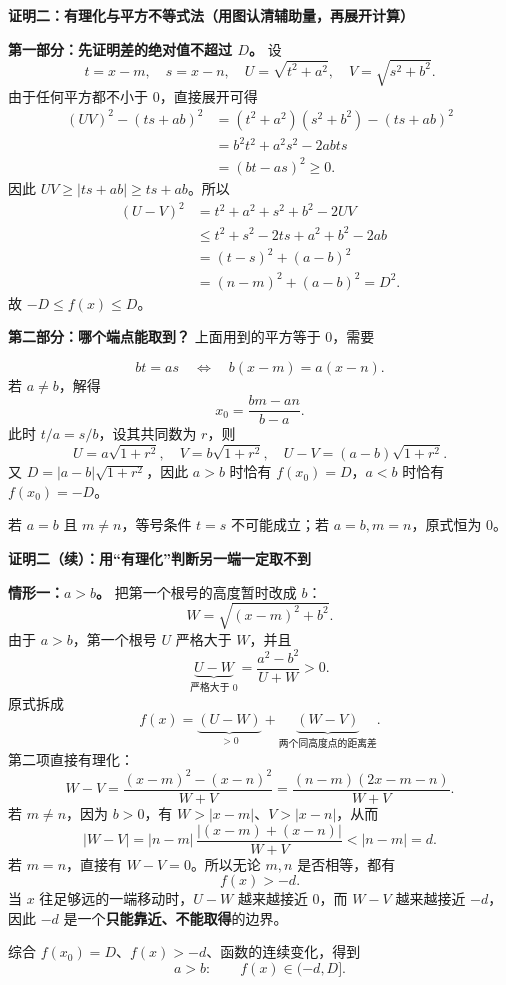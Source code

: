 \begin{proofbox}
\textbf{\textcolor{CProof}{证明二：有理化与平方不等式法（用图认清辅助量，再展开计算）}}



\textbf{第一部分：先证明差的绝对值不超过 $D$。} 设
\[
 t=x-m,\quad s=x-n,\quad
 U=\sqrt{t^2+a^2},\quad V=\sqrt{s^2+b^2}.
\]
由于任何平方都不小于 $0$，直接展开可得
\[
 \begin{aligned}
 (UV)^2-(ts+ab)^2
 &=(t^2+a^2)(s^2+b^2)-(ts+ab)^2\\
 &=b^2t^2+a^2s^2-2abts\\
 &=(bt-as)^2\geq0.
 \end{aligned}
\]
因此 $UV\geq|ts+ab|\geq ts+ab$。所以
\[
 \begin{aligned}
 (U-V)^2
 &=t^2+a^2+s^2+b^2-2UV\\
 &\leq t^2+s^2-2ts+a^2+b^2-2ab\\
 &=(t-s)^2+(a-b)^2\\
 &=(n-m)^2+(a-b)^2=D^2.
 \end{aligned}
\]
故 $\boxed{-D\leq f(x)\leq D}$。

\end{proofbox}
\clearpage
\begin{proofbox}
\textbf{第二部分：哪个端点能取到？} 上面用到的平方等于 $0$，需要


\[
 bt=as\quad\Longleftrightarrow\quad
 b(x-m)=a(x-n).
\]
若 $a\ne b$，解得
\[
 \boxed{x_0=\frac{bm-an}{b-a}}.
\]
此时 $t/a=s/b$，设其共同数为 $r$，则
\[
 U=a\sqrt{1+r^2},\quad V=b\sqrt{1+r^2},\quad
 U-V=(a-b)\sqrt{1+r^2}.
\]
又 $D=|a-b|\sqrt{1+r^2}$，因此 $a>b$ 时恰有 $f(x_0)=D$，$a<b$ 时恰有 $f(x_0)=-D$。

若 $a=b$ 且 $m\ne n$，等号条件 $t=s$ 不可能成立；若 $a=b,m=n$，原式恒为 $0$。
\end{proofbox}
\clearpage
\begin{proofbox}
\textbf{\textcolor{CProof}{证明二（续）：用“有理化”判断另一端一定取不到}}



\textbf{情形一：$a>b$。} 把第一个根号的高度暂时改成 $b$：
\[
 W=\sqrt{(x-m)^2+b^2}.
\]
由于 $a>b$，第一个根号 $U$ 严格大于 $W$，并且
\[
 \underbrace{U-W}_{\text{严格大于 }0}
 =\frac{a^2-b^2}{U+W}>0.
\]
原式拆成
\[
 f(x)=\underbrace{(U-W)}_{>0}+\underbrace{(W-V)}_{\text{两个同高度点的距离差}}.
\]
第二项直接有理化：
\[
 W-V=\frac{(x-m)^2-(x-n)^2}{W+V}
 =\frac{(n-m)(2x-m-n)}{W+V}.
\]
若 $m\ne n$，因为 $b>0$，有 $W>|x-m|$、$V>|x-n|$，从而
\[
 |W-V|
 =|n-m|\,\frac{|(x-m)+(x-n)|}{W+V}
 <|n-m|=d.
\]
若 $m=n$，直接有 $W-V=0$。所以无论 $m,n$ 是否相等，都有
\[
 \boxed{f(x)>-d}.
\]
当 $x$ 往足够远的一端移动时，$U-W$ 越来越接近 $0$，而 $W-V$ 越来越接近 $-d$，因此 $-d$ 是一个\textbf{只能靠近、不能取得}的边界。

综合 $f(x_0)=D$、$f(x)>-d$、函数的连续变化，得到
\[
 \boxed{a>b:\qquad f(x)\in(-d,D]}.
\]
\end{proofbox}
